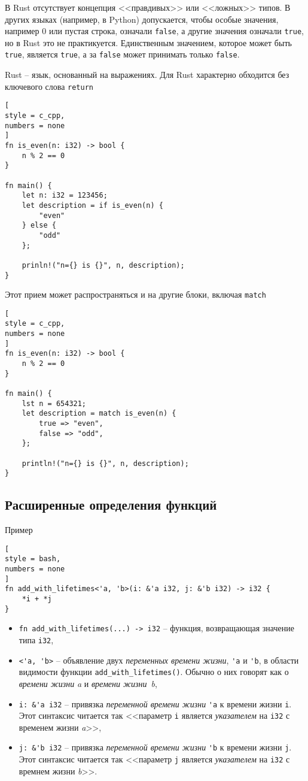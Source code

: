 \documentclass[%
	11pt,
	a4paper,
	utf8,
		]{article}
\begin{document}
В Rust отсутствует концепция <<правдивых>> или <<ложных>> типов. В других языках (например, в Python) допускается, чтобы особые значения, например 0 или пустая строка, означали \texttt{false}, а другие значения означали \texttt{true}, но в Rust это не практикуется. Единственным значением, которое может быть \texttt{true}, является \texttt{true}, а за \texttt{false} может принимать только \texttt{false}.

Rust -- язык, основанный на выражениях. Для Rust характерно обходится без ключевого слова \texttt{return}
\begin{lstlisting}[
style = c_cpp,
numbers = none
]
fn is_even(n: i32) -> bool {
    n % 2 == 0
}

fn main() {
    let n: i32 = 123456;
    let description = if is_even(n) {
        "even"
    } else {
        "odd"
    };

    prinln!("n={} is {}", n, description);
}
\end{lstlisting}

Этот прием может распространяться и на другие блоки, включая \texttt{match}
\begin{lstlisting}[
style = c_cpp,
numbers = none
]
fn is_even(n: i32) -> bool {
    n % 2 == 0
}

fn main() {
    lst n = 654321;
    let description = match is_even(n) {
        true => "even",
        false => "odd",
    };

    println!("n={} is {}", n, description);
}
\end{lstlisting}

\subsection{Расширенные определения функций}

Пример
\begin{lstlisting}[
style = bash,
numbers = none
]
fn add_with_lifetimes<'a, 'b>(i: &'a i32, j: &'b i32) -> i32 {
    *i + *j
}
\end{lstlisting}
\begin{itemize}
	\item \verb|fn add_with_lifetimes(...) -> i32| -- функция, возвращающая значение типа \verb|i32|,
	
	\item \verb|<'a, 'b>| -- объявление двух \emph{переменных времени жизни}, \verb|'a| и \verb|'b|, в области видимости функции \verb|add_with_lifetimes()|. Обычно о них говорят как о \emph{времени жизни} \emph{a} и \emph{времени жизни}~\emph{b},
	
	\item \verb|i: &'a i32| -- привязка {\color{blue}\emph{переменной времени жизни} \verb|'a|} к времени жизни \texttt{i}. Этот синтаксис читается так <<параметр \texttt{i} является \emph{указателем} на \verb|i32| с {\color{blue}временем жизни \emph{a}}>>,
	
	\item \verb|j: &'b i32| -- привязка {\color{blue}\emph{переменной времени жизни} \verb|'b|} к времени жизни \texttt{j}. Этот синтаксис читается так <<параметр \texttt{j} является \emph{указателем} на \verb|i32| с {\color{blue}времнем жизни \emph{b}}>>.
\end{itemize}
\end{document}
